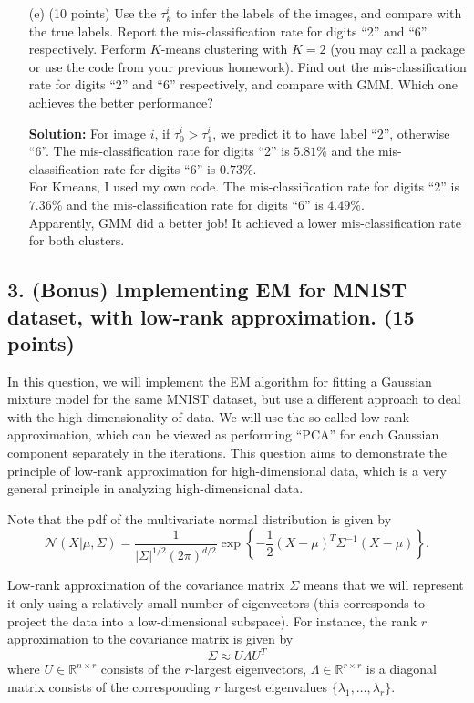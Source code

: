 \documentclass[twoside,12pt]{article}
\begin{document}
\begin{enumerate}
\item[(e)] (10 points) Use the $\tau_{k}^i$ to infer the labels of the images, and compare with the true labels. Report the mis-classification rate for digits ``2'' and ``6'' respectively. Perform $K$-means clustering with $K=2$ (you may call a package or use the code from your previous homework). Find out the  mis-classification rate for digits ``2'' and ``6'' respectively, and compare with GMM. Which one achieves the better performance?
\begin{tcolorbox}
\textbf{Solution:} For image $i$, if $\tau_0^i > \tau_1^i$, we predict it to have label ``2'', otherwise ``6''. The mis-classification rate for digits ``2''  is $5.81\%$ and the mis-classification rate for digits ``6''  is $0.73\%$. \\

For Kmeans, I used my own code. The mis-classification rate for digits ``2''  is $7.36\%$ and the mis-classification rate for digits ``6''  is $4.49\%$.\\

Apparently, GMM did a better job! It achieved a lower mis-classification rate for both clusters. 
\end{tcolorbox}

\end{enumerate}


\subsection*{3. (Bonus) Implementing EM for MNIST dataset, with low-rank approximation. (15 points)}

In this question, we will implement the EM algorithm for fitting a Gaussian mixture model for the same MNIST dataset, but use a different approach to deal with the high-dimensionality of data. We will use the so-called low-rank approximation, which can be viewed as performing ``PCA'' for each Gaussian component separately in the iterations. This question aims to demonstrate the principle of low-rank approximation for high-dimensional data, which is a very general principle in analyzing high-dimensional data.  

Note that the pdf of the multivariate normal distribution is given by
\[
\mathcal N(X|\mu, \Sigma) = \frac{1}{|\Sigma|^{1/2} (2\pi)^{d/2}} 
\exp\left\{- \frac 1 2 (X-\mu)^T \Sigma^{-1}(X-\mu) \right\}.
\]

Low-rank approximation of the covariance matrix $\Sigma$ means that we will represent it only using a relatively small number of eigenvectors (this corresponds to project the data into a low-dimensional subspace). For instance, the rank $r$ approximation to the covariance matrix is given by
\[
\Sigma \approx U \Lambda U^T
\]
where $U \in \mathbb R^{n\times r}$ consists of the $r$-largest eigenvectors, $\Lambda \in \mathbb R^{r\times r}$ is a diagonal matrix consists of the corresponding $r$ largest eigenvalues $\{\lambda_1, \ldots, \lambda_r\}$. 
\end{document}
